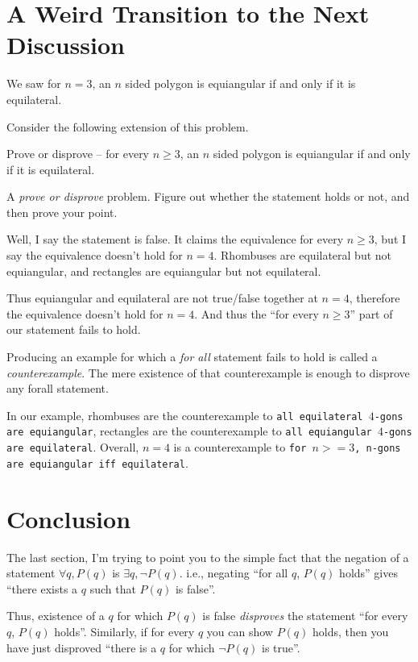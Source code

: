 \section*{A Weird Transition to the Next Discussion}
We saw for $n = 3$, an $n$ sided polygon is equiangular if and only if it is equilateral.

Consider the following extension of this problem.
\begin{SNP}{\prb}Prove or disprove -- for every $n \geq 3$, an $n$ sided polygon is equiangular if and only if it is equilateral.
\end{SNP}

A \textit{prove or disprove} problem. Figure out whether the statement holds or not, and then prove your point.

Well, I say the statement is false. It claims the equivalence for every $n \geq 3$, but I say the equivalence doesn't hold for $n = 4$. Rhombuses are equilateral but not equiangular, and rectangles are equiangular but not equilateral.

Thus equiangular and equilateral are not true/false together at $n = 4$, therefore the equivalence doesn't hold for $n = 4$. And thus the ``for every $n \geq 3$'' part of our statement fails to hold.

Producing an example for which a \textit{for all} statement fails to hold is called a \textit{counterexample}. The mere existence of that counterexample is enough to disprove any forall statement.

In our example, rhombuses are the counterexample to \texttt{all equilateral $4$-gons are equiangular}, rectangles are the counterexample to \texttt{all equiangular $4$-gons are equilateral}. Overall, $n = 4$ is a counterexample to \texttt{for $n >= 3$, n-gons are equiangular iff equilateral}.

\section*{Conclusion}
The last section, I'm trying to point you to the simple fact that the negation of a statement $\forall q, P(q)$ is $\exists q, \neg P (q)$. i.e., negating ``for all $q$, $P(q)$ holds'' gives ``there exists a $q$ such that $P(q)$ is false''.

Thus, existence of a $q$ for which $P(q)$ is false \textit{disproves} the statement ``for every $q$, $P(q)$ holds''. Similarly, if for every $q$ you can show $P(q)$ holds, then you have just disproved ``there is a $q$ for which $\neg P(q)$ is true''.
